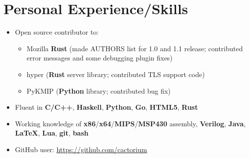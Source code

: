 \documentclass{my_resume}
\begin{document}
\section{Personal Experience/Skills}
\begin{itemize}
	\item Open source contributor to:
	\begin{itemize}
		\item Mozilla \textbf{Rust} (made AUTHORS list for 1.0 and 1.1 release;
			contributed error messages and some debugging plugin fixes)
		\item hyper (\textbf{Rust} server library; contributed TLS support code)
		\item PyKMIP (\textbf{Python} library; contributed bug fix)
	\end{itemize}
	\item Fluent in \textbf{C/C++}, \textbf{Haskell}, \textbf{Python},
		\textbf{Go}, \textbf{HTML5}, \textbf{Rust}
	\item Working knowledge of \textbf{x86}/\textbf{x64}/\textbf{MIPS}/\textbf{MSP430} assembly,
		\textbf{Verilog}, \textbf{Java}, \textbf{LaTeX},
		\textbf{Lua}, \textbf{git}, \textbf{bash}
    \item GitHub user: \url{https://github.com/cactorium}
\end{itemize}
\end{document}
